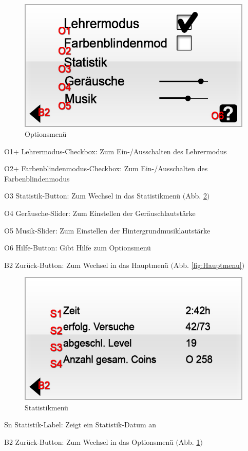 \begin{figure}[H]
\centering
\includegraphics[scale=0.55]{../gui/_jpeg_numeration/settings.jpg}
\caption{Optionsmenü}
\label{fig:Optionsmenu}
\end{figure}
\begin{description*}
\item[O1+] Lehrermodus-Checkbox: Zum Ein-/Ausschalten des Lehrermodus
\item[O2+] Farbenblindenmodus-Checkbox: Zum Ein-/Ausschalten des Farbenblindenmodus
\item[O3] Statistik-Button: Zum Wechsel in das Statistikmenü $($Abb. \ref{fig:Statistikmenu}$)$
\item[O4] Geräusche-Slider: Zum Einstellen der Geräuschlautstärke
\item[O5] Musik-Slider: Zum Einstellen der Hintergrundmusiklautstärke
\item[O6] Hilfe-Button: Gibt Hilfe zum Optionsmenü
\item[B2] Zurück-Button: Zum Wechsel in das Hauptmenü $($Abb. \ref{fig:Hauptmenu}$)$
\end{description*}


\begin{figure}[H]
\centering
\includegraphics[scale=0.55]{../gui/_jpeg_numeration/stat.jpg}
\caption{Statistikmenü}
\label{fig:Statistikmenu}
\end{figure}
\begin{description*}
\item[Sn] Statistik-Label: Zeigt ein Statistik-Datum an
\item[B2] Zurück-Button: Zum Wechsel in das Optionsmenü $($Abb. \ref{fig:Optionsmenu}$)$
\end{description*}

